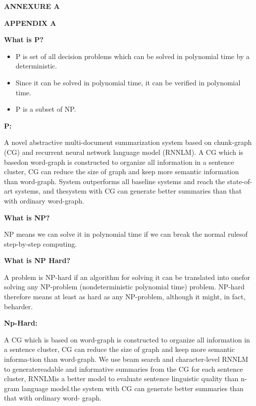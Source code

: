 \documentclass[12pt]{report}
\begin{document}


\centering
\Large\textbf{ANNEXURE A }

\centering

\Large\textbf{APPENDIX A}\\
\justifying
\setlength{\parindent}{4em}
\setlength{\parskip}{0.5em}
\renewcommand{\baselinestretch}{1.5}
\normalsize
\raggedright\textbf{What is P?}
\begin{itemize}
\item P is set of all decision problems which can be solved in polynomial time by a
deterministic.\\
\item  Since it can be solved in polynomial time, it can be verified in polynomial time.\\
\item  P is a subset of NP.
\end{itemize}

\textbf{P:}

A novel abstractive multi-document summarization system based on chunk-graph (CG) and
recurrent neural network language model (RNNLM). A CG which is basedon word-graph is 
constructed to organize all information in a sentence cluster, CG can reduce the size of graph 
and keep more semantic information than word-graph. System outperforms all baseline systems 
and reach the state-of-art systems, and thesystem with CG can generate better summaries than
that with ordinary word-graph.



\vspace{1cm}

\textbf{What is NP?
}

NP means we can solve it in polynomial time if we can break the normal rulesof step-by-step
computing.

\textbf{What is NP Hard?}

A problem is NP-hard if an algorithm for solving it can be translated into onefor solving
any NP-problem (nondeterministic polynomial time) problem. NP-hard therefore means at
least as hard as any NP-problem, although it might, in fact, beharder.

\textbf{Np-Hard:
}

A CG which is based on word-graph is constructed to organize all information in a sentence 
cluster, CG can reduce the size of graph and keep more semantic informa-tion than word-graph. 
We use beam search and character-level RNNLM to generatereadable and informative summaries
from the CG for each sentence cluster, RNNLMis a better model to evaluate sentence linguistic
quality than n-gram language model.the system with CG can generate better summaries than that 
with ordinary word- graph.
\end{document}

